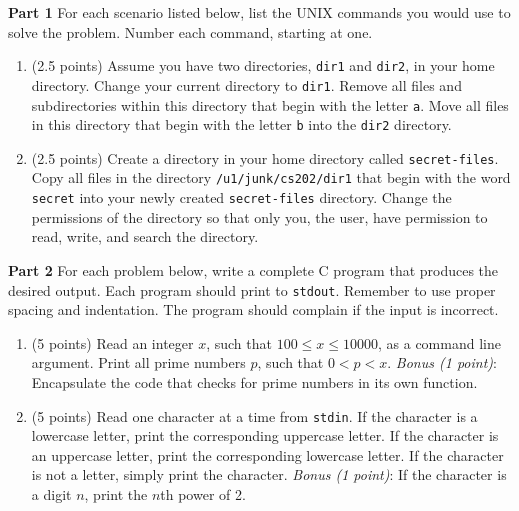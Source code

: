 \documentclass[12pt]{article}
\begin{document}
\noindent
\textbf{Part 1} For each scenario listed below, list the UNIX commands you
would use to solve the problem. Number each command, starting at one.
\begin{enumerate}
  \item (2.5 points) Assume you have two directories, \texttt{dir1} and \texttt{dir2}, in
    your home directory. Change your current directory to \texttt{dir1}. Remove
    all files and subdirectories within this directory that begin with the
    letter \texttt{a}. Move all files in this directory that begin with the
    letter \texttt{b} into the \texttt{dir2} directory.
  \item (2.5 points) Create a directory in your home directory called \texttt{secret-files}.
    Copy all files in the directory \texttt{/u1/junk/cs202/dir1} that begin with
    the word \texttt{secret} into your newly created \texttt{secret-files}
    directory. Change the permissions of the directory so that only you, the
    user, have permission to read, write, and search the directory.
\end{enumerate}

\noindent
\textbf{Part 2} For each problem below, write a complete C program that
produces the desired output. Each program should print to \texttt{stdout}.
Remember to use proper spacing and indentation. The program should complain if
the input is incorrect.
\begin{enumerate}
  \item (5 points) Read an integer $x$, such that $100 \leq x \leq 10000$, as a
    command line argument. Print all prime numbers $p$, such that $0 < p
    < x$. \textit{Bonus (1 point)}: Encapsulate the code that checks for prime numbers in
    its own function.
  \item (5 points) Read one character at a time from \texttt{stdin}. If the
    character is a lowercase letter, print the corresponding uppercase letter.
    If the character is an uppercase letter, print the corresponding lowercase
    letter. If the character is not a letter, simply print the character.
    \textit{Bonus (1 point)}: If the character is a digit $n$, print the $n$th
    power of 2.
\end{enumerate}
\end{document}
